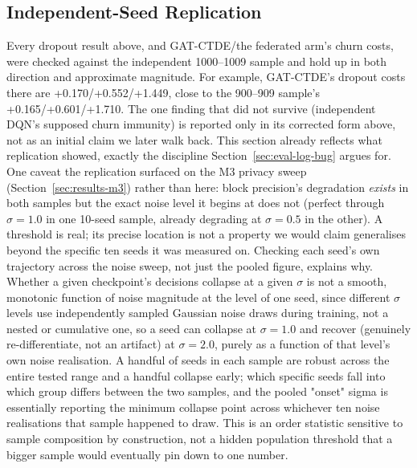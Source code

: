 \documentclass[journal]{IEEEtran}
\begin{document}
\subsection{Independent-Seed Replication}
Every dropout result above, and GAT-CTDE/the federated arm's churn
costs, were checked against the independent 1000--1009 sample and hold
up in both direction and approximate magnitude. For example, GAT-CTDE's
dropout costs there are +0.170/+0.552/+1.449, close to the 900--909
sample's +0.165/+0.601/+1.710. The one finding that did not survive
(independent DQN's supposed churn immunity) is reported only in its
corrected form above, not as an initial claim we later walk back.
This section already reflects what replication showed, exactly the
discipline Section~\ref{sec:eval-log-bug} argues for. One caveat the
replication surfaced on the M3 privacy sweep
(Section~\ref{sec:results-m3}) rather than here: block precision's
degradation \emph{exists} in both samples but the exact noise level it
begins at does not (perfect through $\sigma=1.0$ in one 10-seed sample,
already degrading at $\sigma=0.5$ in the other). A threshold is real;
its precise location is not a property we would claim generalises
beyond the specific ten seeds it was measured on. Checking each seed's
own trajectory across the noise sweep, not just the pooled figure,
explains why. Whether a given checkpoint's decisions collapse at a
given $\sigma$ is not a smooth, monotonic function of noise magnitude
at the level of one seed, since different $\sigma$ levels use independently
sampled Gaussian noise draws during training, not a nested or
cumulative one, so a seed can collapse at $\sigma=1.0$ and recover
(genuinely re-differentiate, not an artifact) at $\sigma=2.0$, purely
as a function of that level's own noise realisation. A handful of
seeds in each sample are robust across the entire tested range and a
handful collapse early; which specific seeds fall into which group
differs between the two samples, and the pooled "onset" sigma is
essentially reporting the minimum collapse point across whichever ten
noise realisations that sample happened to draw. This is an order statistic
sensitive to sample composition by construction, not a hidden
population threshold that a bigger sample would eventually pin down to
one number.
\end{document}
